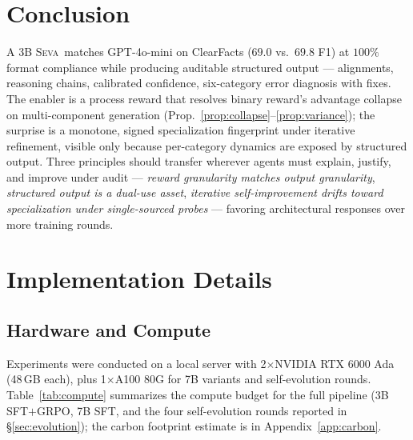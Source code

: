 \documentclass{article}
\newcommand{\seva}{\textsc{Seva}\xspace}
\begin{document}
\section{Conclusion}
\label{sec:conclusion}

A 3B \seva\ matches GPT-4o-mini on ClearFacts ($69.0$ vs.\ $69.8$ F1) at $100\%$ format compliance while producing auditable structured output --- alignments, reasoning chains, calibrated confidence, six-category error diagnosis with fixes. The enabler is a process reward that resolves binary reward's advantage collapse on multi-component generation (Prop.~\ref{prop:collapse}--\ref{prop:variance}); the surprise is a monotone, signed specialization fingerprint under iterative refinement, visible only because per-category dynamics are exposed by structured output. Three principles should transfer wherever agents must explain, justify, and improve under audit --- \emph{reward granularity matches output granularity}, \emph{structured output is a dual-use asset}, \emph{iterative self-improvement drifts toward specialization under single-sourced probes} --- favoring architectural responses over more training rounds.






\newpage
\appendix

\section{Implementation Details}
\label{app:impl}

\subsection{Hardware and Compute}

Experiments were conducted on a local server with 2$\times$NVIDIA RTX 6000 Ada (48\,GB each), plus 1$\times$A100 80G for 7B variants and self-evolution rounds.
Table~\ref{tab:compute} summarizes the compute budget for the full pipeline (3B SFT$+$GRPO, 7B SFT, and the four self-evolution rounds reported in \S\ref{sec:evolution}); the carbon footprint estimate is in Appendix~\ref{app:carbon}.
\end{document}

